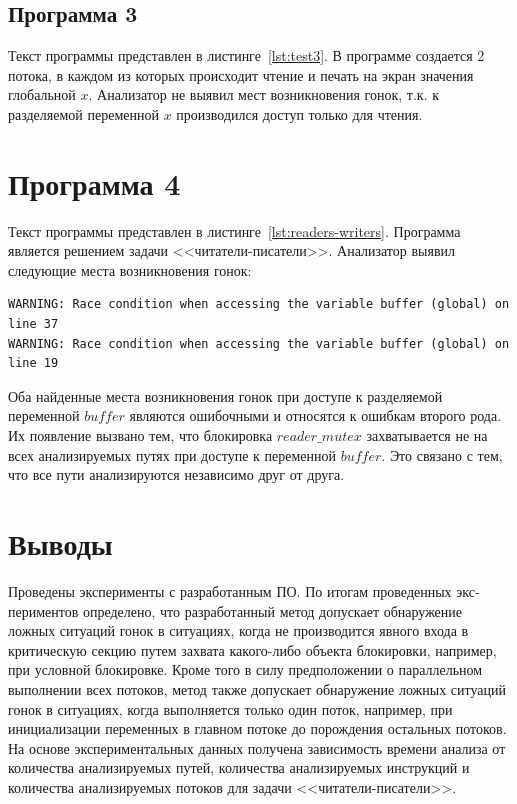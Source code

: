 

\subsection{Программа 3}

Текст программы представлен в листинге~\ref{lst:test3}. В программе создается 2 потока, в каждом из которых происходит чтение и печать на экран значения глобальной $x$. Анализатор не выявил мест возникновения гонок, т.к. к разделяемой переменной $x$ производился доступ только для чтения.



\section{Программа 4}

Текст программы представлен в листинге~\ref{lst:readers-writers}. Программа является решением задачи <<читатели-писатели>>. Анализатор выявил следующие места возникновения гонок:
\begin{verbatim}
WARNING: Race condition when accessing the variable buffer (global) on line 37
WARNING: Race condition when accessing the variable buffer (global) on line 19
\end{verbatim}
Оба найденные места возникновения гонок при доступе к разделяемой переменной $buffer$ являются ошибочными и относятся к ошибкам второго рода. Их появление вызвано тем, что блокировка $reader\_mutex$ захватывается не на всех анализируемых путях при доступе к переменной $buffer$. Это связано с тем, что все пути анализируются независимо друг от друга.

\section{Выводы}

Проведены эксперименты с разработанным ПО. По итогам проведенных экс­периментов определено, что разработанный метод допускает обнаружение ложных ситуаций гонок в ситуациях, когда не производится явного входа в крити­ческую секцию путем захвата какого-либо объекта блокировки, например, при условной блокировке. Кроме того в силу предположении о параллельном выполнении всех потоков, метод также допускает обнаружение ложных ситуаций гонок в ситуациях, когда выполняется только один поток, например, при инициализации переменных в главном потоке до порождения остальных потоков. На основе экспериментальных данных получена зависимость времени анализа от количества анализируемых путей, количества анализируемых инструкций и количества анализируемых потоков для задачи <<читатели-писатели>>.
